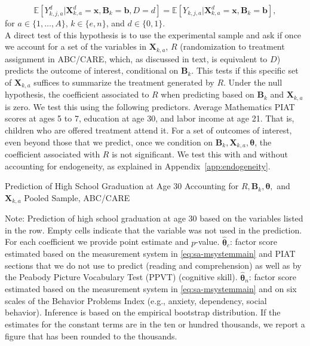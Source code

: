 \begin{equation}\label{eq:invariancetestapp}
\mathbb{E} \left[ Y_{k,j,a}^d | \bm{X}_{k,a}^d  = \bm{x}, \bm{B}_k = \bm{b}, D = d \right] = \mathbb{E} \left[ Y_{k,j,a} | \bm{X}^d_{k,a}  = \bm{x}, \bm{B}_k = \bm{b} \right],
\end{equation}
for $a \in \{1,\dots,A\}$, $k \in \{e,n\}$, and $d \in \{0,1\}$.\\

\noindent A direct test of this hypothesis is to use the experimental sample and ask if once we account for a set of the variables in $\bm{X}_{k,a}$, $R$ (randomization to treatment assignment in ABC/CARE, which, as discussed in text, is equivalent to $D$) predicts the outcome of interest, conditional on $\bm{B}_k$. This tests if this specific set of $\bm{X}_{k,a}$ suffices to summarize the treatment generated by $R$. Under the null hypothesis, the coefficient associated to $R$ when predicting based on $\bm{B}_k$ and $\bm{X}_{k,a}$ is zero. We test this using the following predictors. Average Mathematics PIAT scores at ages 5 to 7, education at age 30, and labor income at age 21. That is, children who are offered treatment attend it. For a set of outcomes of interest, even beyond those that we predict, once we condition on $\bm{B}_k, \bm{X}_{k,a}, \bm{\theta}$, the coefficient associated with $R$ is not significant. We test this with and without accounting for endogeneity, as explained in Appendix~\ref{app:endogeneity}.\\

\begin{table}
\begin{threeparttable}
\caption{Prediction of High School Graduation at Age 30 Accounting for $R, \bm{B}_k, \bm{\theta},$ and $\bm{X}_{k,a}$ Pooled Sample, ABC/CARE}
\label{table:end2}
\centering
\scriptsize

\begin{tablenotes}
\footnotesize
\item Note: Prediction of high school graduation at age 30 based on the variables listed in the row. Empty cells indicate that the variable was not used in the prediction. For each coefficient we provide point estimate and $p$-value. $\hat{\bm{\theta}}_{c}$: factor score estimated based on the measurement system in \eqref{eq:sa-msystemmain} and PIAT sections that we do not use to predict (reading and comprehension) as well as by the Peabody Picture Vocabulary Test (PPVT) (cognitive skill). $\hat{\bm{\theta}}_{n}$: factor score estimated based on the measurement system in \eqref{eq:sa-msystemmain} and on six scales of the Behavior Problems Index (e.g., anxiety, dependency, social behavior). Inference is based on the empirical bootstrap distribution. If the estimates for the constant terms are in the ten or hundred thousands, we report a figure that has been rounded to the thousands.
\end{tablenotes}
\end{threeparttable}
\end{table}

